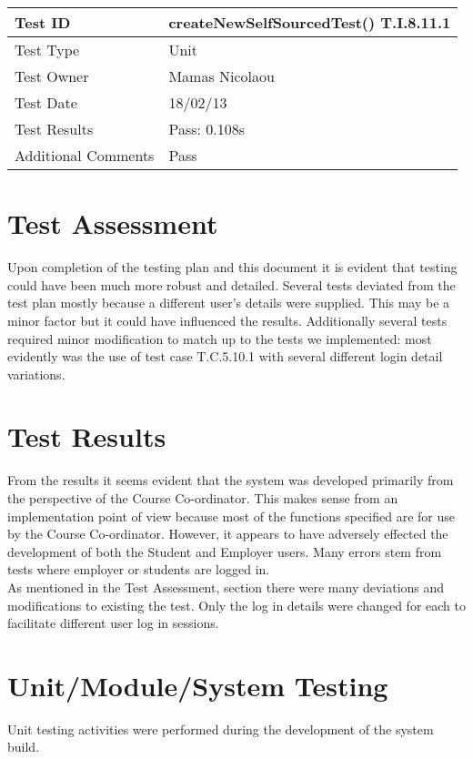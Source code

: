 \documentclass{l3deliverable}
\begin{document}
\vspace{4 mm}

\begin{tabular}{|p{2cm}|p{12cm}|}
\hline
Test ID & createNewSelfSourcedTest() T.I.8.11.1\\
\hline
Test Type & Unit\\
\hline
Test Owner  & Mamas Nicolaou\\
\hline
Test Date & 18/02/13\\
\hline
Test Results & Pass: 0.108s\\
\hline
Additional Comments & Pass\\
\hline
\end{tabular}

\section{Test Assessment}
Upon completion of the testing plan and this document it is evident that testing could have been much more robust and detailed. Several tests deviated from the test plan mostly because a different user's details were supplied. This may be a minor factor but it could have influenced the results. Additionally several tests required minor modification to match up to the tests we implemented: most evidently was the use of test case T.C.5.10.1 with several different login detail variations.

\section{Test Results}
From the results it seems evident that the system was developed primarily from the perspective of the Course Co-ordinator. This makes sense from an implementation point of view because most of the functions specified are for use by the Course Co-ordinator. However, it appears to have adversely effected the development of both the Student and Employer users. Many errors stem from tests where employer or students are logged in.\\
As mentioned in the Test Assessment, section there were many deviations and modifications to existing the test. Only the log in details were changed for each to facilitate different user log in sessions. 

\section{Unit/Module/System Testing}
Unit testing activities were performed during the development of the system build.
\end{document}
